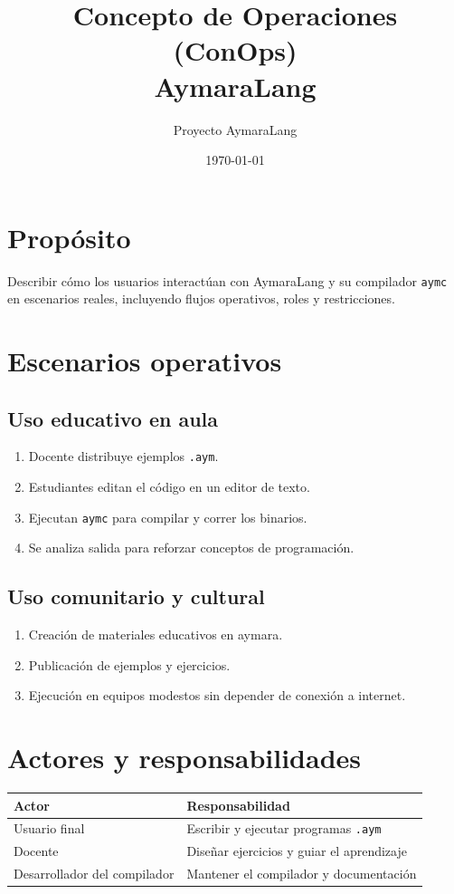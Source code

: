 \documentclass[11pt,a4paper]{article}
\title{Concepto de Operaciones (ConOps)\\AymaraLang}
\author{Proyecto AymaraLang}
\date{\today}
\begin{document}
\maketitle

\section{Propósito}
Describir cómo los usuarios interactúan con AymaraLang y su compilador \texttt{aymc} en escenarios reales, incluyendo flujos operativos, roles y restricciones.

\section{Escenarios operativos}
\subsection{Uso educativo en aula}
\begin{enumerate}
    \item Docente distribuye ejemplos \texttt{.aym}.
    \item Estudiantes editan el código en un editor de texto.
    \item Ejecutan \texttt{aymc} para compilar y correr los binarios.
    \item Se analiza salida para reforzar conceptos de programación.
\end{enumerate}

\subsection{Uso comunitario y cultural}
\begin{enumerate}
    \item Creación de materiales educativos en aymara.
    \item Publicación de ejemplos y ejercicios.
    \item Ejecución en equipos modestos sin depender de conexión a internet.
\end{enumerate}

\section{Actores y responsabilidades}
\begin{longtable}{@{}p{4cm}p{9cm}@{}}
\toprule
\textbf{Actor} & \textbf{Responsabilidad} \\ \midrule
Usuario final & Escribir y ejecutar programas \texttt{.aym} \\
Docente & Diseñar ejercicios y guiar el aprendizaje \\
Desarrollador del compilador & Mantener el compilador y documentación \\ \bottomrule
\end{longtable}
\end{document}
